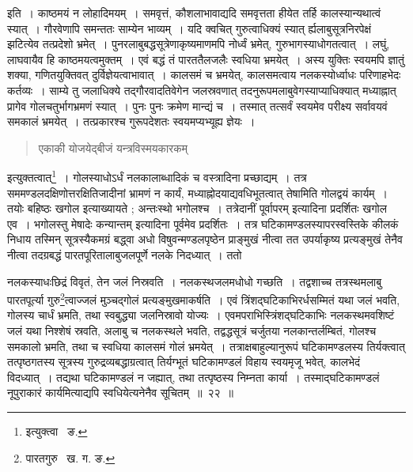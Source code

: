 \documentclass[11pt, openany]{book}
\begin{document}
\indent इति~। काष्ठमयं न लोहादिमयम्~। समवृत्तं, कौशलाभावाद्यदि समवृत्तता हीयेत तर्हि कालस्यान्यथात्वं स्यात्~। गौरवेणापि 
समन्ततः साम्येन भाव्यम्~। यदि क्वचित् गुरुत्वाधिक्यं स्यात् र्ह्यलाबुसूत्रनिरपेक्षं झटित्येव तत्प्रदेशो भ्रमेत्~। पुनरलाबुबद्धसूत्रेणाकृष्यमाणमपि नोर्ध्वं भ्रमेत्, गुरुभागस्याधोगतत्वात्~। लघुं, लाघवायैव हि काष्ठमयत्वमुक्तम्~। एवं बद्धं तं पारततैलजलैः स्वधिया भ्रमयेत्~। अस्य युक्तिः 
स्वयमपि ज्ञातुं शक्या, गणितयुक्तिवत् दुर्विज्ञेयत्वाभावात्~। कालसमं च भ्रमयेत्, कालसमत्वाय नलकस्योर्ध्वाधः परिणाहभेदः कर्तव्यः~। साम्ये तु जलाधिक्ये तद्गौरवादतिवेगेन जलस्रवणात् तदनुरूपमलाबुवेगस्याप्याधिक्यात् मध्याह्नात् प्रागेव गोलचतुर्भागभ्रमणं स्यात्~। पुनः पुनः क्रमेण मान्द्यं च~। तस्मात् तत्सर्वं स्वयमेव परीक्ष्य सर्वावयवं समकालं भ्रमयेत्~। तत्प्रकारश्च गुरूपदेशतः स्वयमप्यभ्यूह्य ज्ञेयः~।
 
\begin{quote}
{\qt एकाकी योजयेद्बीजं यन्त्रविस्मयकारकम्}
\end{quote}

\noindent इत्युक्तत्वात्\renewcommand{\thefootnote}{१}\footnote{इत्युक्त्वा \textendash\ ङ.}~। गोलस्याधोऽर्धं नलकालाब्धादिकं च वस्त्रादिना प्रच्छाद्यम्~। तत्र सममण्डलदक्षिणोत्तरक्षितिजादीनां भ्रामणं न कार्यं, मध्याह्नोदयाद्यवधिभूतत्वात् तेषामिति गोलद्वयं कार्यम्~। तयोः बहिष्ठः खगोल इत्याख्यायते ; अन्तःस्थो भगोलश्च~। तत्रेदानीं {\qt पूर्वापरम्} इत्यादिना प्रदर्शितः खगोल एव~। भगोलस्तु {\qt मेषादेः कन्यान्तम्} इत्यादिना पूर्वमेव प्रदर्शितः~। तत्र घटिकामण्डलस्यापरस्वस्तिके कीलकं निधाय तस्मिन् सूत्रस्यैकमग्रं बद्ध्वा अधो विषुवन्मण्डलपृष्ठेन प्राङ्मुखं नीत्वा तत उपर्याकृष्य प्रत्यङ्मुखं तेनैव नीत्वा तदग्रबद्धं पारतपूरितालाबुजलपूर्णे 
नलके निदध्यात्~। ततो 

\newpage

\noindent नलकस्याधःछिद्रं विवृतं, तेन जलं निस्रवति~। नलकस्थजलमधोधो गच्छति~। तद्वशाच्च तत्रस्थमलाबु पारतपूर्त्या गुरु\renewcommand{\thefootnote}{१}\footnote{पारतगुरु \textendash\ ख. ग. ङ.}त्वाज्जलं मुञ्चद्गोलं प्रत्यङ्मुखमाकर्षति~। एवं त्रिंशद्घटिकाभिरर्धसम्मितं यथा जलं भवति, गोलस्य चार्धं भ्रमति, तथा स्वबुद्ध्या जलनिस्रावो योज्यः~। एवमपराभिस्त्रिंशद्घटिकाभिः नलकस्थमवशिष्टं जलं यथा निश्शेषं स्रवति, अलाबु च नलकस्थले भवति, तद्वद्धसूत्रं चर्जुतया नलकान्तर्लम्बितं, गोलश्च समकालो भ्रमति, तथा च स्वधिया कालसमं गोलं भ्रमयेत्~। तत्राक्षबाहुल्यानुरूपं घटिकामण्डलस्य तिर्यक्त्वात् तत्पृष्ठगतस्य सूत्रस्य गुरुद्रव्यबद्धाग्रत्वात् तिर्यग्भूतं घटिकामण्डलं विहाय स्वयमृजू भवेत्, कालभेदं विदध्यात्~। तद्यथा घटिकामण्डलं न जह्यात्, तथा तत्पृष्ठस्य निम्नता कार्या~। तस्माद्घटिकामण्डलं नूपुराकारं कार्यमित्याद्यपि स्वधियेत्यनेनैव सूचितम्~॥~२२~॥ \\
\end{document}

